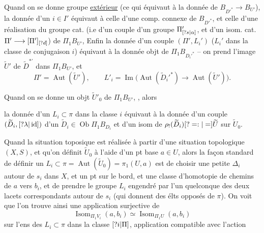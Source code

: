 Quand on se donne   groupe \uline{extérieur}  (ce qui  équivaut à la donnée de \(B_{D'^*}\longrightarrow B_{U'}\)), la donnée d'un  \(i\in I'\) équivaut à celle d'une comp. connexe de \(B_{D'^*}\), et celle d'une réalisation  du groupe cat. (i.e d'un couple d'un groupe \(\Pi'_{[?s|\alpha]}\), et d'un isom. cat. \(\Pi'\longrightarrow[\Pi']_{[?d]}\))   de \(\Pi_1B_{U'}\), Enfin la donnée d'un couple \((\Pi',L_i')\) (\(L_i'\) dans la classe de conjugaison \(i\)) équivaut  à la donnée  objt  de \(\Pi_1B_{D_i'^*}\) -- on prend l'image \(\widetilde U'\) de \(\widetilde D^{*'}\) dans \(\Pi_1B_{U'}\), et
\[
\Pi'=\operatorname{Aut}(\widetilde U'),\qquad
L'_i=\operatorname{Im}\bigl(\operatorname{Aut}(\widetilde D_i'^*)\longrightarrow
\operatorname{Aut}(\widetilde U')\bigr).
\]

Quand on se donne   un objt \(\widetilde U'_0\) de \(\Pi_1B_{U'}\),  , alors


la donnée d'un \(L_i\subset\pi\) dans la classe \(i\) équivaut à la donnée d'un couple \((\widetilde D_i,[?\lambda|\operatorname{id}])\) d'un \(\widetilde D_i\in\operatorname{Ob}\Pi_1B_{D_i}\) et d'un isom de \(\rho_!(\widetilde D_i)[?=:|=]\widetilde U\) sur \(\widetilde U_0\).

Quand  la situation toposique est réalisée à partir d'une situation topologique \((X,S)\), et qu'on définit \(\widetilde U_0\) à l'aide d'un pt base \(a\in U\), alors la façon standard de définir un \(L_i\subset\pi=\operatorname{Aut}(\widetilde U_0)=\pi_1(U,a)\) est de choisir une petite  \(\Delta_i\) autour de \(s_i\) dans \(X\),
et un pt  sur le bord, et une classe d'homotopie de chemins  de \(a\) vers \(b_i\), et de prendre le groupe \(L_i\) engendré par l'un quelconque des deux lacets correspondants autour de \(s_i\) (qui donnent des  élts opposés de \(\pi\)).
On voit que l'on trouve ainsi une application surjective de
\[
\operatorname{Isom}_{\Pi_1V_i}(a,b_i)\simeq
\operatorname{Isom}_{\Pi_1U}(a,b_i)
\]
 sur l'ens des \(L_i\subset\pi\) dans la classe \([?i|\Pi]\), application  compatible avec l'action

